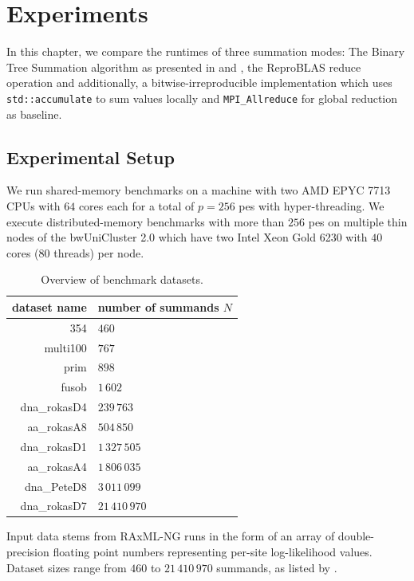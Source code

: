 \chapter{Experiments}
\label{ch:Experiments}

In this chapter, we compare the runtimes of three summation modes:
The Binary Tree Summation algorithm as presented in  and , the ReproBLAS reduce operation and additionally, a bitwise-irreproducible implementation which uses \texttt{std::accumulate} to sum values locally and \texttt{MPI\_Allreduce} for global reduction as baseline.

\section{Experimental Setup}
\label{sec:ExperimentalSetup}
We run shared-memory benchmarks on a machine with two AMD EPYC 7713 CPUs with $64$ cores each for a total of $p=256$ \glspl{pe} with hyper-threading.
We execute distributed-memory benchmarks with more than $256$ \glspl{pe} on multiple thin nodes of the bwUniCluster 2.0 which have two Intel Xeon Gold 6230  with $40$ cores ($80$ threads) per node.


\begin{table}
\centering
\caption{Overview of benchmark datasets.}
\label{table:datasets}
\begin{tabular}{r|l}
\textbf{dataset name} & \textbf{number of summands $N$} \\
\hline
354 & $460$ \\
multi100 & $767$ \\
prim & $898$ \\
fusob & $1\,602$ \\
dna\_rokasD4 & $239\,763$ \\
aa\_rokasA8 & $504\,850$ \\
dna\_rokasD1 & $1\,327\,505$ \\
aa\_rokasA4 & $1\,806\,035$ \\
dna\_PeteD8 & $3\,011\,099$ \\
dna\_rokasD7 & $21\,410\,970$ \\
\end{tabular}
\end{table}

Input data stems from RAxML-NG runs in the form of an array of double-precision floating point numbers representing per-site log-likelihood values.
Dataset sizes range from $460$ to $21\,410\,970$ summands, as listed by .

